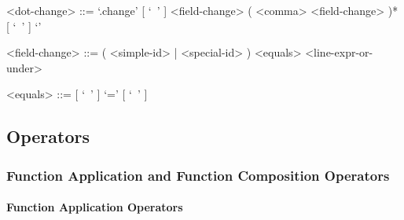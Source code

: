 \documentclass{article}
\begin{document}
\begin{itemize}
\begin{grammar}
<dot-change> ::=
`.change{' [ `\ ' ] <field-change> ( <comma> <field-change> )* [ `\ ' ] `}'

<field-change> ::= ( <simple-id> | <special-id> ) <equals> <line-expr-or-under>

<equals> ::= [ `\ ' ] `=' [ `\ ' ]
\end{grammar}

\end{itemize}

\subsection{Operators}

\subsubsection{Function Application and Function Composition Operators}

\paragraph{Function Application Operators}
\end{document}

